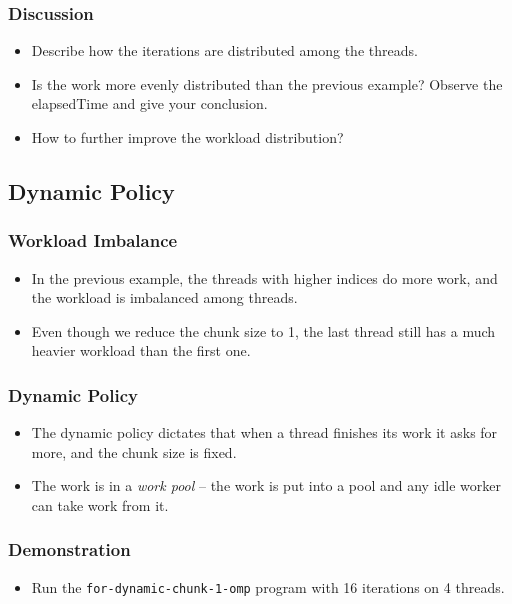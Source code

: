 \documentclass{beamer}
\begin{document}
\begin{frame}
  \frametitle{Discussion}
  \begin{itemize}
  \item Describe how the iterations are distributed among the threads.
  \item Is the work more evenly distributed than the previous example?
    Observe the elapsedTime and give your conclusion.
  \item How to further improve the workload distribution?
  \end{itemize}
\end{frame}

\subsection{Dynamic Policy}

\begin{frame}
  \frametitle{Workload Imbalance}
  \begin{itemize}
  \item In the previous example, the threads with higher indices do
    more work, and the workload is imbalanced among threads.
  \item Even though we reduce the chunk size to 1, the last thread still
    has a much heavier workload than the first one.
  \end{itemize}
\end{frame}

\begin{frame}
  \frametitle{Dynamic Policy}
  \begin{itemize}
  \item The dynamic policy dictates that when a thread finishes its
    work it asks for more, and the chunk size is fixed.
  \item The work is in a {\em work pool} -- the work is put into a
    pool and any idle worker can take work from it.
  \end{itemize}
\end{frame}

\begin{frame}
\end{frame}

\begin{frame}
  \frametitle{Demonstration}
  \begin{itemize}
  \item Run the {\tt for-dynamic-chunk-1-omp} program with 16 iterations
    on 4 threads.
  \end{itemize}
\end{frame}
\end{document}
